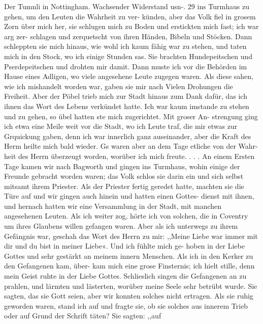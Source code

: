 Der Tumnli in Nottingham. Wachsender Widerstand usn-. 29
ins Turmhaus zu gehen, um den Leuten die Wahrheit zu ver-
künden, aber das Volk fiel in grosem Zorn über mich her, sie
schlugen mich zu Boden und erstickten mich fast; ich war arg zer-
schlagen und zerquetscht von ihren Händen, Bibeln und Stöcken.
Dann schleppten sie mich hinaus, wie wohl ich kaum fähig war
zu stehen, und taten mich in den Stock, wo ich einige Stunden
sas. Sie brachten Hundepeitschen und Pserdepeitschen und drohten
mir damit. Dann muste ich vor die Behörden im Hause eines
Adligen, wo viele angesehene Leute zugegen waren. Als diese
sahen, wie ich mishandelt worden war, gaben sie mir nach
Vielen Drohungen die Freiheit. Aber der Pöbel trieb mich
zur Stadt hinaus zum Dank dafür, das ich ihnen das Wort des
Lebens verkündet hatte. Ich war kaum imstande zu stehen und
zu gehen, so übel hatten ste mich zugerichtet. Mit groser An-
strengung ging ich etwa eine Meile weit vor die Stadt, wo ich
Leute traf, die mir etwas zur Grquickung gaben, denn ich war
innerlich ganz auseinander, aber die Kraft des Herm heilte mich
bald wieder. Gs waren aber an dem Tage etliche von der Wahr-
heit des Herrn überzeugt worden, worüber ich mich freute. . . .
An einem Ersten Tage kamen wir nach Bagworth und gingen
ins Turmhaus, wohin einige der Freunde gebracht worden waren;
das Volk schlos sie darin ein und sich selbst mitsamt ihrem
Priester. Als der Priester fertig geredet hatte, machten sie die
Türe auf und wir gingen auch hinein und hatten einen Gottes-
dienst mit ihnen, und hernach hatten wir eine Versammlung in
der Stadt, mit manchen angesehenen Leuten. Als ich weiter zog,
hörte ich von solchen, die in Coventry um ihres Glaubens willen
gefangen waren. Aber als ich unterwegs zu ihrem Gefängnis war,
geschah das Wort des Herrn zu mir: ,,Meine Liebe war immer
mit dir und du bist in meiner Liebe«. Und ich fühlte mich ge-
hoben in der Liebe Gottes und sehr gestärkt an meinem innern
Menschen. Als ich in den Kerker zu den Gefangenen kam, über-
kam mich eine grose Finsternis; ich hielt stille, denn mein Geist
ruhte in der Liebe Gottes. Schlieslich singen die Gefangenen
an zu prahlen, und lärmten und lästerten, worüber meine
Seele sehr betrübt wurde. Sie sagten, das sie Gott seien, aber
wir konnten solches nicht ertragen. Als sie ruhig geworden
waren, stand ich auf und fragte sie, ob sie solches aus innerem
Trieb oder auf Grund der Schrift täten? Sie sagten: ,,auf


